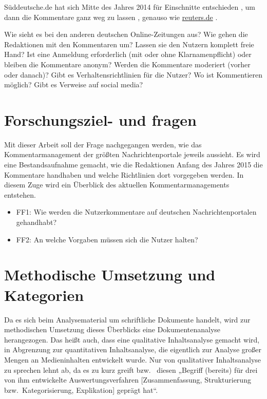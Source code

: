 Süddeutsche.de hat sich Mitte des Jahres 2014 für Einschnitte entschieden
\autocite{mark}, um dann die Kommentare ganz weg zu lassen \autocite{fromm},
genauso wie \url{reuters.de} \autocite{standard}.


Wie sieht es bei den anderen deutschen Online-Zeitungen aus? Wie gehen die
Redaktionen mit den Kommentaren um? Lassen sie den Nutzern komplett freie Hand?
Ist eine Anmeldung erforderlich (mit oder ohne Klarnamenpflicht) oder bleiben
die Kommentare anonym? Werden die Kommentare moderiert (vorher oder danach)?
Gibt es Verhaltensrichtlinien für die Nutzer? Wo ist Kommentieren möglich? Gibt
es Verweise auf social media?


\section{Forschungsziel- und fragen}

Mit dieser Arbeit soll der Frage nachgegangen werden, wie das
Kommentarmanagement der größten Nachrichtenportale jeweils aussieht. Es wird
eine Bestandsaufnahme gemacht, wie die Redaktionen Anfang des Jahres 2015 die
Kommentare handhaben und welche Richtlinien dort vorgegeben werden. In diesem
Zuge wird ein Überblick des aktuellen Kommentarmanagements entstehen.

\begin{itemize} \em
  \item FF1: Wie werden die Nutzerkommentare auf deutschen Nachrichtenportalen
    gehandhabt?
  \item FF2: An welche Vorgaben müssen sich die Nutzer halten?
\end{itemize}


\section{Methodische Umsetzung und Kategorien}

Da es sich beim Analysematerial um schriftliche Dokumente handelt, wird zur
methodischen Umsetzung dieses Überblicks eine Dokumentenanalyse herangezogen.
Das heißt auch, dass eine qualitative Inhaltsanalyse gemacht wird, in Abgrenzung
zur quantitativen Inhaltsanalyse, die eigentlich zur Analyse großer Mengen an
Medieninhalten entwickelt wurde. Nur von qualitativer Inhaltsanalyse zu sprechen
lehnt \textcite{kunzler} ab, da es zu kurz greift bzw.~\textcite{mayring} diesen
„Begriff (bereits) für drei von ihm entwickelte Auswertungsverfahren
[Zusammenfassung, Strukturierung bzw.~Kategorisierung, Explikation] geprägt hat“.

